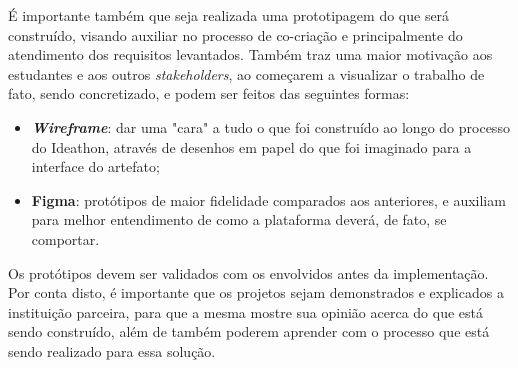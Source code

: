 É importante também que seja realizada uma prototipagem do que será construído, visando auxiliar no processo de co-criação e principalmente do atendimento dos requisitos levantados. Também traz uma maior motivação aos estudantes e aos outros \textit{stakeholders}, ao começarem a visualizar o trabalho de fato, sendo concretizado, e podem ser feitos das seguintes formas:

\begin{itemize}
    \item \textbf{\textit{Wireframe}}: dar uma "cara" a tudo o que foi construído ao longo do processo do Ideathon, através de desenhos em papel do que foi imaginado para a interface do artefato;
    
    \item \textbf{Figma}: protótipos de maior fidelidade comparados aos anteriores, e auxiliam para melhor entendimento de como a plataforma deverá, de fato, se comportar.

\end{itemize}

Os protótipos devem ser validados com os envolvidos antes da implementação. Por conta disto, é importante que os projetos sejam demonstrados e explicados a instituição parceira, para que a mesma mostre sua opinião acerca do que está sendo construído, além de também poderem aprender com o processo que está sendo realizado para essa solução.

